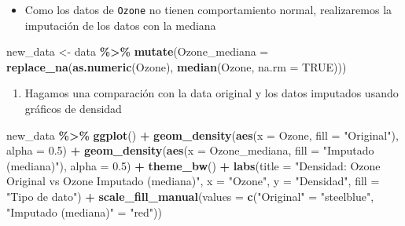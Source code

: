 \documentclass[
]{book}
\newenvironment{Shaded}{\begin{snugshade}}{\end{snugshade}}
\newcommand{\AttributeTok}[1]{\textcolor[rgb]{0.13,0.29,0.53}{#1}}
\newcommand{\ConstantTok}[1]{\textcolor[rgb]{0.56,0.35,0.01}{#1}}
\newcommand{\FloatTok}[1]{\textcolor[rgb]{0.00,0.00,0.81}{#1}}
\newcommand{\FunctionTok}[1]{\textcolor[rgb]{0.13,0.29,0.53}{\textbf{#1}}}
\newcommand{\NormalTok}[1]{#1}
\newcommand{\OtherTok}[1]{\textcolor[rgb]{0.56,0.35,0.01}{#1}}
\newcommand{\SpecialCharTok}[1]{\textcolor[rgb]{0.81,0.36,0.00}{\textbf{#1}}}
\newcommand{\StringTok}[1]{\textcolor[rgb]{0.31,0.60,0.02}{#1}}
\providecommand{\tightlist}{%
  \setlength{\itemsep}{0pt}\setlength{\parskip}{0pt}}
\begin{document}
\begin{itemize}
\tightlist
\item
  Como los datos de \texttt{Ozone} no tienen comportamiento normal, realizaremos la imputación de los datos con la mediana
\end{itemize}

\begin{Shaded}
\begin{Highlighting}[]
\NormalTok{new\_data }\OtherTok{\textless{}{-}}\NormalTok{ data }\SpecialCharTok{\%\textgreater{}\%}
  \FunctionTok{mutate}\NormalTok{(}\AttributeTok{Ozone\_mediana =}  \FunctionTok{replace\_na}\NormalTok{(}\FunctionTok{as.numeric}\NormalTok{(Ozone), }\FunctionTok{median}\NormalTok{(Ozone, }\AttributeTok{na.rm =} \ConstantTok{TRUE}\NormalTok{)))}
\end{Highlighting}
\end{Shaded}

\begin{enumerate}
\def\labelenumi{\arabic{enumi}.}
\setcounter{enumi}{3}
\tightlist
\item
  Hagamos una comparación con la data original y los datos imputados usando gráficos de densidad
\end{enumerate}

\begin{Shaded}
\begin{Highlighting}[]
\NormalTok{new\_data }\SpecialCharTok{\%\textgreater{}\%} 
  \FunctionTok{ggplot}\NormalTok{() }\SpecialCharTok{+}
  \FunctionTok{geom\_density}\NormalTok{(}\FunctionTok{aes}\NormalTok{(}\AttributeTok{x =}\NormalTok{ Ozone, }\AttributeTok{fill =} \StringTok{"Original"}\NormalTok{), }\AttributeTok{alpha =} \FloatTok{0.5}\NormalTok{) }\SpecialCharTok{+}
  \FunctionTok{geom\_density}\NormalTok{(}\FunctionTok{aes}\NormalTok{(}\AttributeTok{x =}\NormalTok{ Ozone\_mediana, }\AttributeTok{fill =} \StringTok{"Imputado (mediana)"}\NormalTok{), }\AttributeTok{alpha =} \FloatTok{0.5}\NormalTok{) }\SpecialCharTok{+}
  \FunctionTok{theme\_bw}\NormalTok{() }\SpecialCharTok{+}
  \FunctionTok{labs}\NormalTok{(}\AttributeTok{title =} \StringTok{"Densidad: Ozone Original vs Ozone Imputado (mediana)"}\NormalTok{,}
       \AttributeTok{x =} \StringTok{"Ozone"}\NormalTok{,}
       \AttributeTok{y =} \StringTok{"Densidad"}\NormalTok{,}
       \AttributeTok{fill =} \StringTok{"Tipo de dato"}\NormalTok{) }\SpecialCharTok{+}
  \FunctionTok{scale\_fill\_manual}\NormalTok{(}\AttributeTok{values =} \FunctionTok{c}\NormalTok{(}\StringTok{"Original"} \OtherTok{=} \StringTok{"steelblue"}\NormalTok{, }\StringTok{"Imputado (mediana)"} \OtherTok{=} \StringTok{"red"}\NormalTok{))}
\end{Highlighting}
\end{Shaded}
\end{document}

